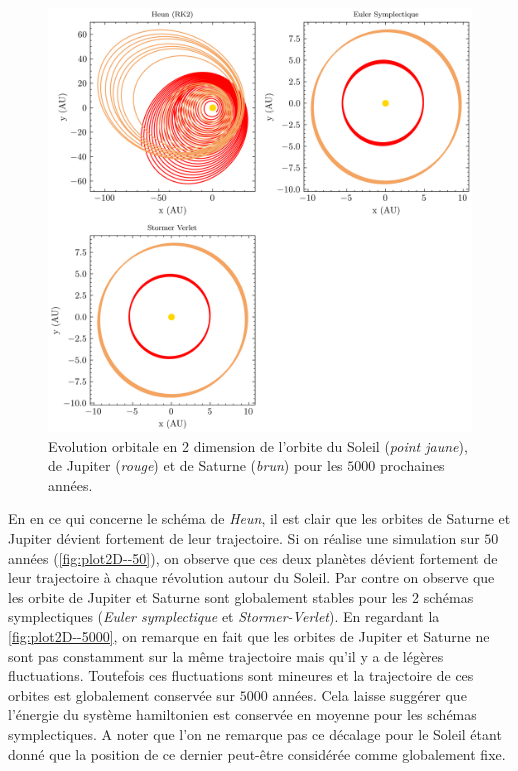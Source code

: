 \documentclass[11pt,twoside=semi,openright,numbers=noenddot]{article}
\begin{document}
\begin{figure}[H]
    \centering
    \includegraphics{figures/5000_years/orbital-plot2d.png}
    \caption{Evolution orbitale en 2 dimension de l'orbite du Soleil (\emph{point jaune}), de Jupiter (\emph{rouge}) et de Saturne (\emph{brun}) pour les $5000$ prochaines années.}
    \label{fig:plot2D--5000}
\end{figure}

En en ce qui concerne le schéma de \emph{Heun}, il est clair que les orbites de Saturne et Jupiter dévient fortement de leur trajectoire. Si on réalise une simulation sur $50$ années (\autoref{fig:plot2D--50}), on observe que ces deux planètes dévient fortement de leur trajectoire à chaque révolution autour du Soleil.
Par contre on observe que les orbite de Jupiter et Saturne sont globalement stables pour les 2 schémas symplectiques (\emph{Euler symplectique} et \emph{Stormer-Verlet}). En regardant la \autoref{fig:plot2D--5000}, on remarque en fait que les orbites de Jupiter et Saturne ne sont pas constamment sur la même trajectoire mais qu'il y a de légères fluctuations. Toutefois ces fluctuations sont mineures et la trajectoire de ces orbites est globalement conservée sur $5000$ années. Cela laisse suggérer que l'énergie du système hamiltonien est conservée en moyenne pour les schémas symplectiques. A noter que l'on ne remarque pas ce décalage pour le Soleil étant donné que la position de ce dernier peut-être considérée comme globalement fixe.
\end{document}

